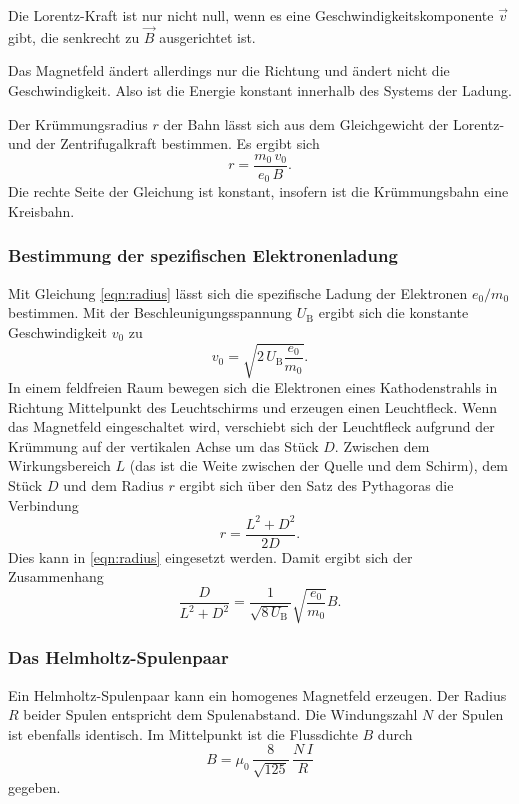 \noindent Die Lorentz-Kraft ist nur nicht null, wenn es eine 
Geschwindigkeitskomponente $\vec{v}$ gibt, die senkrecht zu 
$\vec{B}$ ausgerichtet ist. 

\noindent Das  Magnetfeld ändert allerdings nur die Richtung und ändert 
nicht die Geschwindigkeit. Also ist die Energie konstant 
innerhalb des Systems der Ladung.

\noindent Der Krümmungsradius $r$ der Bahn lässt sich aus dem Gleichgewicht der 
Lorentz- und der Zentrifugalkraft bestimmen. Es ergibt sich 
\begin{equation}
    r= \frac{m_\text{0} \, v_\text{0}}{e_\text{0} \, B}.
    \label{eqn:radius}
\end{equation}
Die rechte Seite der Gleichung ist konstant, insofern ist die 
Krümmungsbahn eine Kreisbahn. 

\subsubsection{Bestimmung der spezifischen Elektronenladung}
Mit Gleichung \ref{eqn:radius} lässt sich die spezifische 
Ladung der Elektronen $e_\text{0}/m_\text{0}$ bestimmen. 
Mit der Beschleunigungsspannung $U_\text{B}$ ergibt sich die 
konstante Geschwindigkeit $v_\text{0}$ zu 
\begin{equation*}
    v_\text{0}= \sqrt{2 \, U_\text{B} \frac{e_\text{0}}{m_\text{0}}}.
\end{equation*}
In einem feldfreien Raum bewegen sich die Elektronen eines 
Kathodenstrahls in Richtung Mittelpunkt des Leuchtschirms und 
erzeugen einen Leuchtfleck. 
Wenn das Magnetfeld eingeschaltet wird, verschiebt sich 
der Leuchtfleck aufgrund der Krümmung auf der vertikalen Achse 
um das Stück $D$. Zwischen dem Wirkungsbereich $L$ (das ist die Weite 
zwischen der Quelle und dem Schirm), dem Stück $D$ und dem 
Radius $r$ ergibt sich über den Satz des Pythagoras die 
Verbindung
\begin{equation*}
    r = \frac{L^2 + D^2}{2D}.
\end{equation*}
Dies kann in \ref{eqn:radius} eingesetzt werden.
Damit ergibt sich der Zusammenhang
\begin{equation}
    \frac{D}{L^2 + D^2}= \frac{1}{\sqrt{8 \, U_\text{B}}}\sqrt{\frac{e_\text{0}}{m_\text{0}}} B.
    \label{eqn:Ende}
\end{equation}

\subsubsection{Das Helmholtz-Spulenpaar}
Ein Helmholtz-Spulenpaar kann ein homogenes Magnetfeld erzeugen.
Der Radius $R$ beider Spulen entspricht dem Spulenabstand.
Die Windungszahl $N$ der Spulen ist ebenfalls identisch.
Im Mittelpunkt ist die Flussdichte $B$ durch
\begin{equation}
    B = \mu_0 \, \frac{8}{\sqrt{125}} \, \frac{N \, I}{R}
    \label{eqn:helmholtz}
\end{equation}
gegeben.

